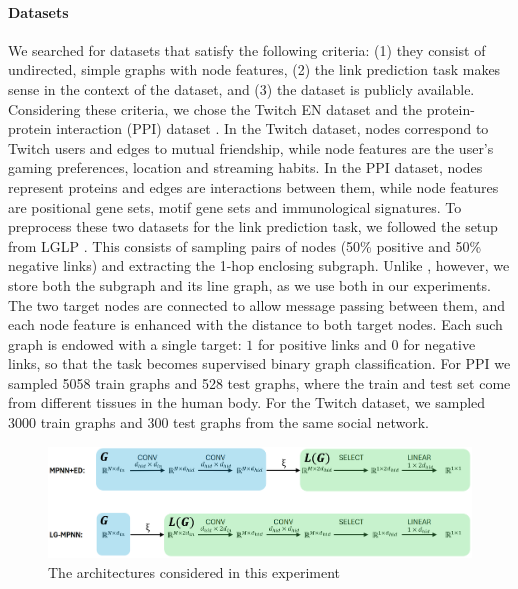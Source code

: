 \documentclass{article}
\begin{document}
\paragraph{Datasets} We searched for datasets that satisfy the following criteria: (1) they consist of undirected, simple graphs with node features, (2) the link prediction task makes sense in the context of the dataset, and (3) the dataset is publicly available. Considering these criteria, we chose the Twitch EN dataset \cite{rozemberczki2021multiscale} and the 
protein-protein interaction (PPI) dataset \cite{zitnik2017predicting}. In the Twitch dataset, nodes correspond to Twitch users and edges to mutual friendship, while node features are the user's gaming preferences, location and streaming habits. In the PPI dataset, nodes represent proteins and edges are interactions between them, while node features are positional gene sets, motif gene sets and immunological signatures.
To preprocess these two datasets for the link prediction task, we followed the setup from LGLP \cite{cai2021line}. This consists of sampling pairs of nodes (50\% positive and 50\% negative links) and extracting the 1-hop enclosing subgraph. Unlike \cite{cai2021line}, however, we store both the subgraph and its line graph, as we use both in our experiments. The two target nodes are connected to allow message passing between them, and each node feature is enhanced with the distance to both target nodes. Each such graph is endowed with a single target: $1$ for positive links and $0$ for negative links, so that the task becomes supervised binary graph classification.
For PPI we sampled 5058 train graphs and 528 test graphs, where the train and test set come from different tissues in the human body. For the Twitch dataset, we sampled 3000 train graphs and 300 test graphs from the same social network. 


\begin{figure}[ht]
    \centering
    \includegraphics[width=\textwidth]{figures/architectures.PNG}
    \caption{The architectures considered in this experiment}
    \label{fig:architectures}
\end{figure}
\end{document}
